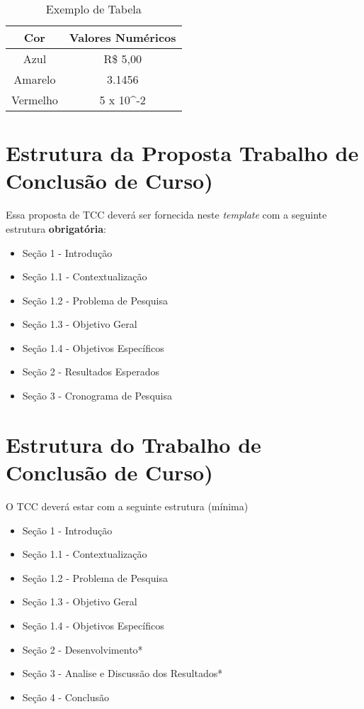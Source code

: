 \documentclass[12pt]{article}
\begin{document}
\begin{table}[ht]
\centering
\begin{tabular}{|c|c|}
\hline
Cor      & Valores Numéricos          \\ \hline
Azul     & R\$ 5,00                   \\ \hline
Amarelo  & 3.1456                     \\ \hline
Vermelho & 5 x 10\textasciicircum{}-2 \\ \hline
\end{tabular}
\caption{Exemplo de Tabela}
\label{tab:exTable1}
\end{table}

\section{Estrutura da Proposta Trabalho de Conclusão de Curso)}

Essa proposta de TCC deverá ser fornecida neste \textit{template} com a seguinte estrutura \textbf{obrigatória}:
\begin{itemize}
\item Seção 1 - Introdução
\item Seção 1.1 - Contextualização
\item Seção 1.2 - Problema de Pesquisa
\item Seção 1.3 - Objetivo Geral
\item Seção 1.4 - Objetivos Específicos
\item Seção 2 - Resultados Esperados
\item Seção 3 - Cronograma de Pesquisa
\end{itemize}

\section{Estrutura do Trabalho de Conclusão de Curso)}

O TCC deverá estar com a seguinte estrutura (mínima)

\begin{itemize}
\item Seção 1 - Introdução
\item Seção 1.1 - Contextualização
\item Seção 1.2 - Problema de Pesquisa
\item Seção 1.3 - Objetivo Geral
\item Seção 1.4 - Objetivos Específicos
\item Seção 2 - Desenvolvimento*
\item Seção 3 - Analise e Discussão dos Resultados*
\item Seção 4 - Conclusão
\end{itemize}
\end{document}
